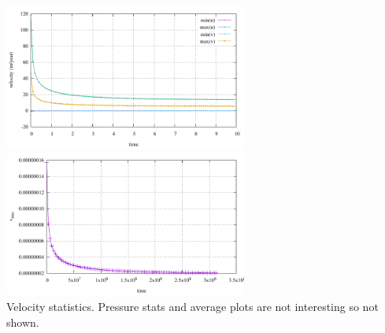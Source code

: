 \begin{center}
\includegraphics[width=8cm]{python_codes/fieldstone_128/results/experiment2/velocity}
\includegraphics[width=8cm]{python_codes/fieldstone_128/results/experiment2/vrms}\\
{\captionfont Velocity statistics. Pressure stats and average plots are not interesting
so not shown.}
\end{center}






